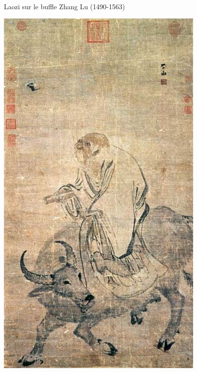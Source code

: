 \begin{marginfigure}
    \centering
        \caption{Laozi sur le buffle Zhang Lu (1490-1563)}
    \includegraphics[width=\textwidth]{ConfucianismeTaoismeBouddhismeChinois/Images/Laozi.jpg}

    \label{fig:enter-label}
\end{marginfigure}



